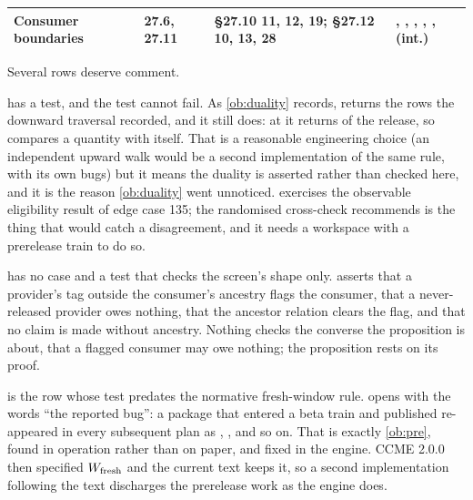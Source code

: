 \begin{center}
\begin{longtable}{@{}L{2.9cm}L{1.6cm}L{2.7cm}L{7.0cm}@{}}
Consumer boundaries & 27.6, 27.11 & \S27.10 11, 12, 19; \S27.12 10, 13, 28 & , , , , ,  (int.) \\
\bottomrule
\end{longtable}
\end{center}
\endgroup

Several rows deserve comment.

 has a test, and the test cannot fail. As
\cref{ob:duality} records,  returns the rows the
downward traversal recorded, and it still does: at  it
returns  of the release, so
 compares a quantity with
itself. That is a reasonable engineering choice (an independent upward walk
would be a second implementation of the same rule, with its own bugs) but it
means the duality is asserted rather than checked here, and it is the reason
\cref{ob:duality} went unnoticed.
 exercises the
observable eligibility result of edge case 135; the randomised cross-check
 recommends is the thing that would catch a disagreement, and it
needs a workspace with a prerelease train to do so.

 has no case and a test that checks the screen's shape
only.  asserts that a provider's tag outside the
consumer's ancestry flags the consumer, that a never-released provider owes
nothing, that the ancestor relation clears the flag, and that no claim is
made without ancestry. Nothing checks the converse the proposition is about,
that a flagged consumer may owe nothing; the proposition rests on its proof.

 is the row whose test predates the normative fresh-window rule.
 opens with the words ``the
reported bug'': a package that entered a beta train and published
 re-appeared in every subsequent plan as ,
, and so on. That is exactly \cref{ob:pre}, found in operation
rather than on paper, and fixed in the engine. CCME 2.0.0 then specified
$W_{\rm fresh}$ and the current text keeps it, so a second implementation
following the text discharges the prerelease work as the engine does.

